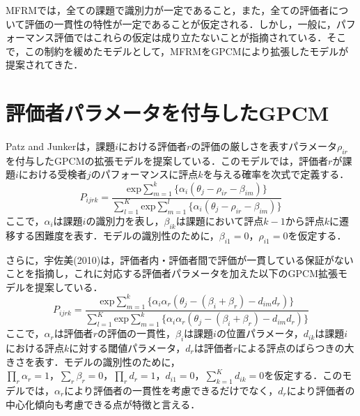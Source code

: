 \documentclass[a4paper,11pt,oneside,openany]{jsbook}
\begin{document}
MFRMでは，全ての課題で識別力が一定であること，また，全ての評価者について評価の一貫性の特性が一定であることが仮定される．しかし，一般に，パフォーマンス評価ではこれらの仮定は成り立たないことが指摘されている\cite{RashUsami,IRTUtoUeno}．そこで，この制約を緩めたモデルとして，MFRMをGPCMにより拡張したモデルが提案されてきた．

\section{評価者パラメータを付与したGPCM}
Patz and Junkerは，課題$i$における評価者$r$の評価の厳しさを表すパラメータ$\rho_{ir}$を付与したGPCMの拡張モデルを提案している\cite{Patz}．このモデルでは，評価者$r$が課題$i$における受検者$j$のパフォーマンスに評点$k$を与える確率を次式で定義する．
\begin{displaymath}
P_{ijrk}=\frac{\mathrm{exp}\sum_{m=1}^{k}\{\alpha_i(\theta_{j}-\rho_{ir}-\beta_{im})\}}{\sum_{l=1}^{K}\mathrm{exp}\sum_{m=1}^{l}\{\alpha_i(\theta_{j}-\rho_{ir}-\beta_{im})\}}
\end{displaymath}
ここで，$\alpha_i$は課題$i$の識別力を表し，$\beta_{ik}$は課題において評点$k-1$から評点$k$に遷移する困難度を表す．モデルの識別性のために，$\beta_{i1}=0，\rho_{i1}=0$を仮定する．

さらに，宇佐美(2010)は，評価者内・評価者間で評価が一貫している保証がないことを指摘し，これに対応する評価者パラメータを加えた以下のGPCM拡張モデルを提案している．
\begin{displaymath}
P_{ijrk}=\frac{\mathrm{exp}\sum_{m=1}^{k}\{\alpha_i\alpha_r(\theta_{j}-(\beta_{i}+\beta_{r})-d_{im}d_r)\}}{\sum_{l=1}^{K}\mathrm{exp}\sum_{m=1}^{k}\{\alpha_i\alpha_r(\theta_{j}-(\beta_{i}+\beta_{r})-d_{im}d_r)\}}
\end{displaymath}
ここで，$\alpha_r$は評価者$r$の評価の一貫性，$\beta_i$は課題$i$の位置パラメータ，$d_{ik}$は課題$i$における評点$k$に対する閾値パラメータ，$d_r$は評価者$r$による評点のばらつきの大きさを表す．モデルの識別性のために，$\prod_{r}\alpha_r=1，\sum_{r}\beta_r=0，\prod_{r}d_r=1，d_{i1}=0，\sum_{k=1}^{K}d_{ik}=0$を仮定する．このモデルでは，$\alpha_r$により評価者の一貫性を考慮できるだけでなく，$d_r$により評価者の中心化傾向も考慮できる点が特徴と言える．
\end{document}
